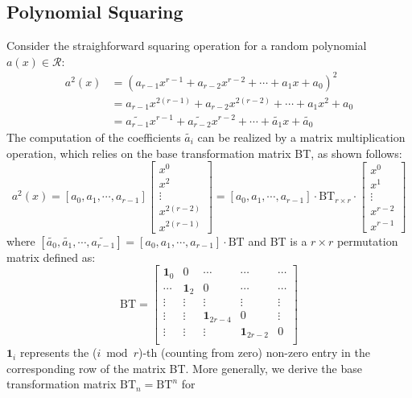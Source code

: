 \documentclass[runningheads]{llncs}
\begin{document}
\subsection{Polynomial Squaring}
\label{sub::square}
Consider the straighforward squaring operation for a random polynomial $a(x)\in \mathcal{R}$:
\begin{align}
    a^2(x) &= (a_{r-1}x^{r-1}+a_{r-2}x^{r-2}+\cdots + a_{1}x + a_0)^2\\
    &= a_{r-1}x^{2(r-1)}+a_{r-2}x^{2(r-2)}+\cdots + a_1x^2 + a_0\\
    &= \widetilde{a_{r-1}}x^{r-1}+\widetilde{a_{r-2}}x^{r-2}+\cdots + \widetilde{a_{1}}x +\widetilde{a_0}
\end{align}
%
The computation of the coefficients $\widetilde{a_{i}}$ can
be realized by a matrix multiplication operation,
which relies on the base transformation matrix BT, as shown follows:
\[
a^2(x)= [{a_{0}},{a_{1}},\cdots,{a_{r-1}}]\left[ \begin{array}{c}
x^{0} \\
x^{2} \\
\vdots\\
x^{2(r-2)}\\
x^{2(r-1)}
\end{array}
\right ]
=
[{a_0},{a_1},\cdots,{a_{r-1}}]
\cdot \text{BT}_{r\times r} \cdot
\left[ \begin{array}{c}
x^{0} \\
x^{1} \\
\vdots\\
x^{r-2}\\
x^{r-1}
\end{array}
\right ]
\]
where $[\widetilde{a_{0}},\widetilde{a_{1}},\cdots,\widetilde{a_{r-1}}]=[{a_{0}},{a_{1}},\cdots,{a_{r-1}}]
\cdot \text{BT}$ and BT is a $r\times r$ permutation matrix defined as:
\[
\text{BT} =
\left[ \begin{array}{ccccc}
\mathbf{1}_{0}&0&\cdots&\cdots&\cdots  \\
\cdots&\mathbf{1}_{2}&0 &\cdots&\cdots \\
\vdots&\vdots&\vdots&\vdots&\vdots\\
\vdots&\vdots&\mathbf{1}_{2r-4}&0&\vdots\\
\vdots&\vdots&\vdots&\mathbf{1}_{2r-2}&0\\
\end{array}
\right ]
\]
$\mathbf{1}_{i}$ represents the ($i\bmod r$)-th (counting from zero) non-zero entry in the corresponding row of the matrix BT.
%
More generally, we derive the base transformation matrix $\text{BT}_n=\text{BT}^n$ for
\end{document}
